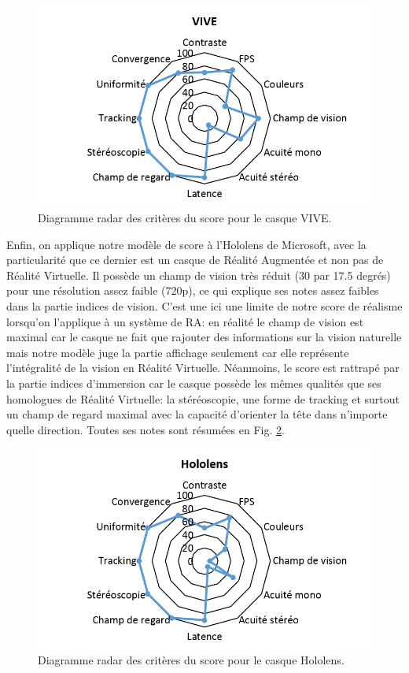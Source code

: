 \begin{figure}
	\centering
	\includegraphics[scale=1]{Figures/RadarScoreVIVE}
	\caption{Diagramme radar des critères du score pour le casque VIVE.}
	\label{fig:radar_score_vive}
\end{figure}

\par Enfin, on applique notre modèle de score à l'Hololens de Microsoft, avec la particularité que ce dernier est un casque de Réalité Augmentée et non pas de Réalité Virtuelle. Il possède un champ de vision très réduit (30 par 17.5 degrés) pour une résolution assez faible (720p), ce qui explique ses notes assez faibles dans la partie indices de vision. C'est une ici une limite de notre score de réalisme lorsqu'on l'applique à un système de RA: en réalité le champ de vision est maximal car le casque ne fait que rajouter des informations sur la vision naturelle mais notre modèle juge la partie affichage seulement car elle représente l'intégralité de la vision en Réalité Virtuelle. Néanmoins, le score est rattrapé par la partie indices d'immersion car le casque possède les mêmes qualités que ses homologues de Réalité Virtuelle: la stéréoscopie, une forme de tracking et surtout un champ de regard maximal avec la capacité d'orienter la tête dans n'importe quelle direction. Toutes ses notes sont résumées en Fig. \ref{fig:radar_score_hololens}.

\begin{figure}
	\centering
	\includegraphics[scale=1]{Figures/RadarScoreHololens}
	\caption{Diagramme radar des critères du score pour le casque Hololens.}
	\label{fig:radar_score_hololens}
\end{figure}

